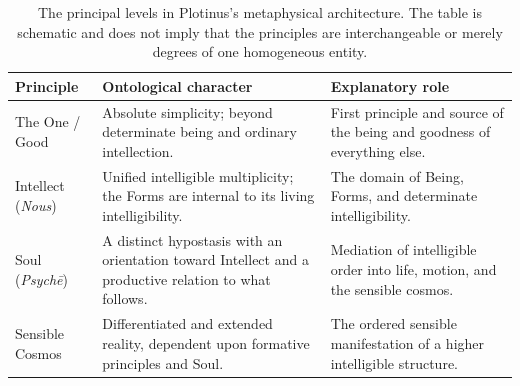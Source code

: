 
\begin{table}[htbp]
    \centering
    \small
    \renewcommand{\arraystretch}{1.35}
    \begin{tabularx}{\textwidth}{
        >{\raggedright\arraybackslash}p{2.6cm}
        >{\raggedright\arraybackslash}X
        >{\raggedright\arraybackslash}X
    }
        \toprule
        \textbf{Principle} &
        \textbf{Ontological character} &
        \textbf{Explanatory role} \\
        \midrule

        The One / Good &
        Absolute simplicity; beyond determinate being and
        ordinary intellection. &
        First principle and source of the being and goodness
        of everything else. \\

        \addlinespace

        Intellect (\textit{Nous}) &
        Unified intelligible multiplicity; the Forms are
        internal to its living intelligibility. &
        The domain of Being, Forms, and determinate
        intelligibility. \\

        \addlinespace

        Soul (\textit{Psychē}) &
        A distinct hypostasis with an orientation toward
        Intellect and a productive relation to what follows. &
        Mediation of intelligible order into life, motion,
        and the sensible cosmos. \\

        \addlinespace

        Sensible Cosmos &
        Differentiated and extended reality, dependent upon
        formative principles and Soul. &
        The ordered sensible manifestation of a higher
        intelligible structure. \\

        \bottomrule
    \end{tabularx}
    \caption{The principal levels in Plotinus's metaphysical
    architecture. The table is schematic and does not imply
    that the principles are interchangeable or merely degrees
    of one homogeneous entity.}
    \label{tab:plotinian-ontological-principles}
\end{table}

